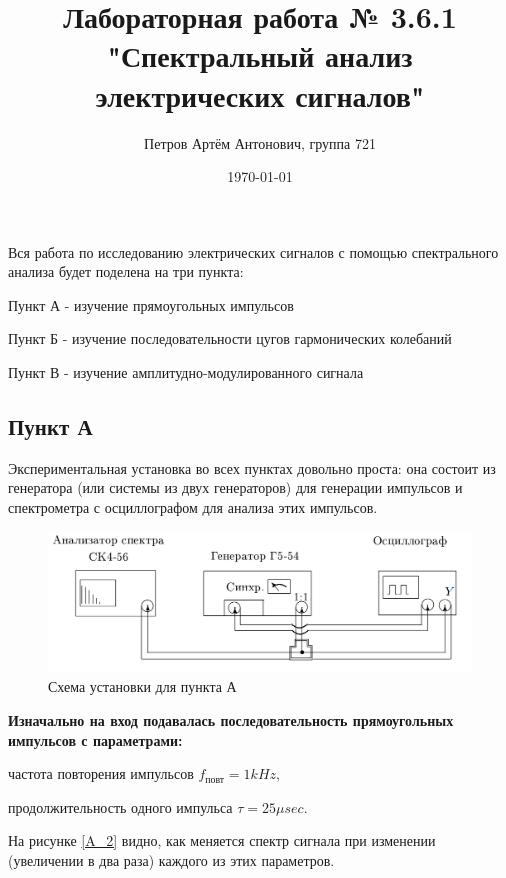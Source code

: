 \documentclass[a4paper,12pt]{article}
\author{Петров Артём Антонович, группа 721}
\title{Лабораторная работа № 3.6.1 "Спектральный анализ электрических сигналов"}
\date{\today}
\begin{document}

\begin{minipage}[t][7cm]{\textwidth}
\maketitle
\end{minipage}

Вся работа по исследованию электрических сигналов с помощью спектрального анализа будет поделена на три пункта:

\medskip
Пункт А - изучение прямоугольных импульсов

\medskip
Пункт Б - изучение последовательности цугов гармонических колебаний

\medskip
Пункт В - изучение амплитудно-модулированного сигнала
\medskip

\bigskip
\subsection*{Пункт А}
\bigskip
Экспериментальная установка во всех пунктах довольно проста: она состоит из генератора (или системы из двух генераторов) для генерации импульсов и спектрометра с осциллографом для анализа этих импульсов.
\begin{figure}[htpb]
\centering
\includegraphics[width=160mm]{scheme1.png}
\caption{Схема установки для пункта А }\label{schema1.png}
\end{figure}

\textbf{Изначально на вход подавалась последовательность прямоугольных импульсов с параметрами: }

частота повторения импульсов $f_\text{повт} = 1 kHz$,

продолжительность одного импульса $\tau = 25 \mu sec$.

На рисунке \ref{A_2} видно, как меняется спектр сигнала при изменении (увеличении в два раза) каждого из этих параметров.
\end{document}
